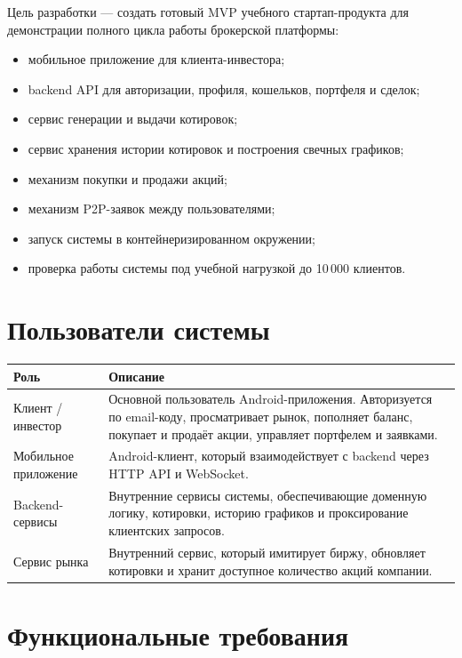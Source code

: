 \documentclass[12pt,a4paper]{article}
\begin{document}
Цель разработки --- создать готовый MVP учебного стартап-продукта для демонстрации
полного цикла работы брокерской платформы:

\begin{itemize}
    \item мобильное приложение для клиента-инвестора;
    \item backend API для авторизации, профиля, кошельков, портфеля и сделок;
    \item сервис генерации и выдачи котировок;
    \item сервис хранения истории котировок и построения свечных графиков;
    \item механизм покупки и продажи акций;
    \item механизм P2P-заявок между пользователями;
    \item запуск системы в контейнеризированном окружении;
    \item проверка работы системы под учебной нагрузкой до 10\,000 клиентов.
\end{itemize}

\section{Пользователи системы}

\begin{longtable}{p{4cm}p{10cm}}
\toprule
\textbf{Роль} & \textbf{Описание} \\
\midrule
\endhead
Клиент / инвестор &
Основной пользователь Android-приложения. Авторизуется по email-коду,
просматривает рынок, пополняет баланс, покупает и продаёт акции, управляет
портфелем и заявками. \\
Мобильное приложение &
Android-клиент, который взаимодействует с backend через HTTP API и WebSocket. \\
Backend-сервисы &
Внутренние сервисы системы, обеспечивающие доменную логику, котировки, историю
графиков и проксирование клиентских запросов. \\
Сервис рынка &
Внутренний сервис, который имитирует биржу, обновляет котировки и хранит
доступное количество акций компании. \\
\bottomrule
\end{longtable}

\section{Функциональные требования}
\end{document}
